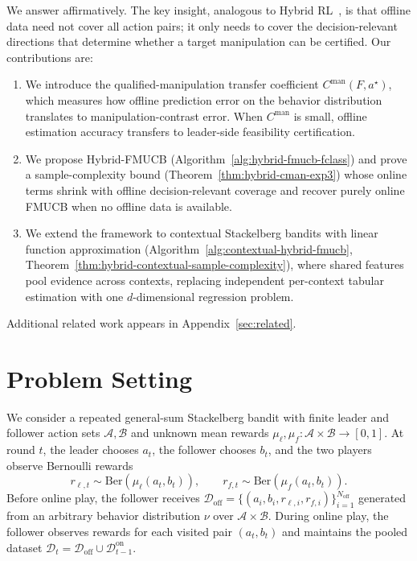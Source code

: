 \documentclass{article}
\newcommand{\cA}{\mathcal{A}}
\newcommand{\cB}{\mathcal{B}}
\newcommand{\cD}{\mathcal{D}}
\begin{document}
We answer affirmatively. The key insight, analogous to Hybrid RL~\cite{song2022hybrid}, is that offline data need not cover all action pairs; it only needs to cover the decision-relevant directions that determine whether a target manipulation can be certified. Our contributions are:
\begin{enumerate}[leftmargin=*,itemsep=2pt]
    \item We introduce the qualified-manipulation transfer coefficient $C^{\mathrm{man}}(F,a^\star)$, which measures how offline prediction error on the behavior distribution translates to manipulation-contrast error. When $C^{\mathrm{man}}$ is small, offline estimation accuracy transfers to leader-side feasibility certification.
    \item We propose Hybrid-FMUCB (Algorithm~\ref{alg:hybrid-fmucb-fclass}) and prove a sample-complexity bound (Theorem~\ref{thm:hybrid-cman-exp3}) whose online terms shrink with offline decision-relevant coverage and recover purely online FMUCB when no offline data is available.
    \item We extend the framework to contextual Stackelberg bandits with linear function approximation (Algorithm~\ref{alg:contextual-hybrid-fmucb}, Theorem~\ref{thm:hybrid-contextual-sample-complexity}), where shared features pool evidence across contexts, replacing independent per-context tabular estimation with one $d$-dimensional regression problem.
\end{enumerate}
Additional related work appears in Appendix~\ref{sec:related}.

\section{Problem Setting}
\label{sec:setting}
We consider a repeated general-sum Stackelberg bandit with finite leader and follower action sets $\cA,\cB$ and unknown mean rewards $\mu_\ell,\mu_f:\cA\times\cB\to[0,1]$. At round $t$, the leader chooses $a_t$, the follower chooses $b_t$, and the two players observe Bernoulli rewards
\[
    r_{\ell,t}\sim\mathrm{Ber}(\mu_\ell(a_t,b_t)),\qquad
    r_{f,t}\sim\mathrm{Ber}(\mu_f(a_t,b_t)).
\]
Before online play, the follower receives $\cD_{\mathrm{off}}=\{(a_i,b_i,r_{\ell,i},r_{f,i})\}_{i=1}^{N_{\mathrm{off}}}$ generated from an arbitrary behavior distribution $\nu$ over $\cA\times\cB$. During online play, the follower observes rewards for each visited pair $(a_t,b_t)$ and maintains the pooled dataset $\cD_t=\cD_{\mathrm{off}}\cup\cD^{\mathrm{on}}_{t-1}$.
\end{document}
